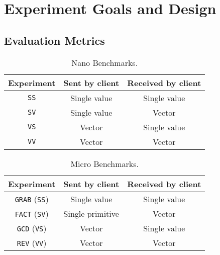 \documentclass{sig-alternate}
\begin{document}
\section{Experiment Goals and Design}
\label{sec:exper-goals-design}

\subsection{Evaluation Metrics}
\label{sec:evmet}

\begin{table}[t]

  \begin{center}
  \begin{tabular}{| c | c | c |}
  \hline
  Experiment & Sent by client & Received by client \\
  \hline
  \texttt{SS} & Single value & Single value \\
  \texttt{SV} & Single value & Vector \\
  \texttt{VS} & Vector & Single value \\
  \texttt{VV} & Vector & Vector \\
  \hline
  \end{tabular}
\end{center}

  \vspace*{-.1in}
  \caption{Nano Benchmarks.}\label{tab:baselines}

\end{table}

\begin{table}[t]

  \begin{center}
  \begin{tabular}{| c | c | c |}
  \hline
  Experiment & Sent by client & Received by client \\
  \hline
  \texttt{GRAB} ({\tt SS}) & Single value & Single value \\
  \texttt{FACT} ({\tt SV}) & Single primitive & Vector \\
  \texttt{GCD}  ({\tt VS}) & Vector & Single value \\
  \texttt{REV}  ({\tt VV}) & Vector & Vector \\
  \hline
  \end{tabular}
\end{center}

  \vspace*{-.1in}
  \caption{Micro Benchmarks.}\label{tab:realworlds}
  \vspace*{-.2in}

\end{table}
\end{document}
